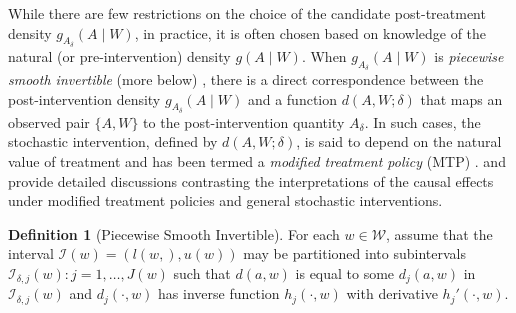 \documentclass[
  12pt, krantz2,
]{krantz}
\theoremstyle{definition}
\theoremstyle{definition}
\theoremstyle{definition}
\newtheorem{definition}{Definition}
\newcommand{\1}{\mathbbm{1}}
\begin{document}
While there are few restrictions on the choice of the candidate post-treatment
density \(g_{A_{\delta}}(A \mid W)\), in practice, it is often chosen based on
knowledge of the natural (or pre-intervention) density \(g(A \mid W)\). When
\(g_{A_{\delta}}(A \mid W)\) is \emph{piecewise smooth invertible} (more below)
\citep{haneuse2013estimation}, there is a direct correspondence between the
post-intervention density \(g_{A_{\delta}}(A \mid W)\) and a function \(d(A, W; \delta)\) that maps an observed pair \(\{A, W\}\) to the post-intervention quantity
\(A_{\delta}\). In such cases, the stochastic intervention, defined by \(d(A, W; \delta)\), is said to depend on the natural value of treatment and has been
termed a \emph{modified treatment policy} (MTP) \citep{haneuse2013estimation, diaz2018stochastic, hejazi2021semiparametric}. \citet{haneuse2013estimation} and
\citet{young2014identification} provide detailed discussions contrasting the
interpretations of the causal effects under modified treatment policies and
general stochastic interventions.

\begin{definition}[Piecewise Smooth Invertible]
\protect\hypertarget{def:ass:piece-inv}{}\label{def:ass:piece-inv}For each \(w \in \mathcal{W}\), assume that the interval
\(\mathcal{I}(w) = (l(w,), u(w))\) may be partitioned into subintervals
\(\mathcal{I}_{\delta,j}(w): j = 1, \ldots, J(w)\) such that \(d(a, w)\) is equal
to some \(d_j(a, w)\) in \(\mathcal{I}_{\delta,j}(w)\) and \(d_j(\cdot,w)\) has
inverse function \(h_j(\cdot, w)\) with derivative \(h_j'(\cdot, w)\).
\end{definition}
\end{document}
